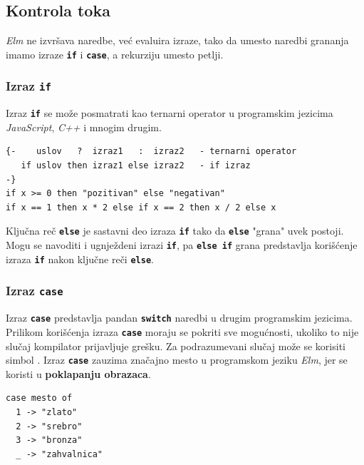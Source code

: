\documentclass[12pt,oneside]{memoir}
\begin{document}
\subsection{Kontrola toka}
\emph{Elm} ne izvršava naredbe, već evaluira izraze, tako da umesto naredbi grananja
imamo izraze \texttt{\textbf{if}} i \texttt{\textbf{case}}, a rekurziju umesto petlji.  
\subsubsection{Izraz \texttt{\textbf{if}}}
Izraz \texttt{\textbf{if}} se može posmatrati kao ternarni operator u programskim jezicima \emph{JavaScript}, \emph{C++} i 
mnogim drugim.
\begin{listing}[h]
\begin{verbatim}
{-    uslov   ?  izraz1   :  izraz2   - ternarni operator
   if uslov then izraz1 else izraz2   - if izraz
-}
if x >= 0 then "pozitivan" else "negativan"
if x == 1 then x * 2 else if x == 2 then x / 2 else x
\end{verbatim}
\caption{Sintaksa izraz \texttt{\textbf{if}} i primer upotrebe}
\label{listing:if}
\end{listing}

Ključna reč \texttt{\textbf{else}} je sastavni deo izraza \texttt{\textbf{if}} tako
da \texttt{\textbf{else}} "grana" uvek postoji. Mogu se navoditi i ugnježdeni
izrazi \texttt{\textbf{if}}, pa \texttt{\textbf{else if}} grana predstavlja korišćenje
izraza \texttt{\textbf{if}} nakon ključne reči \texttt{\textbf{else}}.

\subsubsection{Izraz \texttt{\textbf{case}}}
Izraz \texttt{\textbf{case}} predstavlja pandan \texttt{\textbf{switch}} naredbi u drugim
programskim jezicima. Prilikom korišćenja izraza \texttt{\textbf{case}} moraju se pokriti sve
mogućnosti, ukoliko to nije slučaj kompilator prijavljuje grešku. Za podrazumevani slučaj
može se korisiti simbol \texttt{\textbf{\textunderscore}}. Izraz \texttt{\textbf{case}}
zauzima značajno mesto u programskom jeziku \emph{Elm}, jer se koristi u \textbf{poklapanju obrazaca}.
\begin{listing}[h]
\begin{verbatim}
case mesto of
  1 -> "zlato"
  2 -> "srebro"
  3 -> "bronza"
  _ -> "zahvalnica"
\end{verbatim}
\caption{Primer upotrebe izraza \texttt{\textbf{case}}}
\label{listing:case}
\end{listing}
\end{document}
